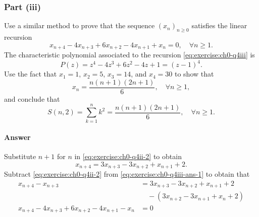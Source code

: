 \subsubsection{Part (iii)}
Use a similar method to prove that the sequence $ (x_n)_{n \geq 0} $ satisfies
    the linear recursion
\begin{equation}
    x_{n + 4} - 4 x_{n + 3} + 6 x_{n + 2} - 4 x_{n + 1} + x_n = 0, \quad
        \forall n \geq 1.
    \label{eq:exercise:ch0-q4iii}
\end{equation}
The characteristic polynomial associated to the recursion
    \eqref{eq:exercise:ch0-q4iii} is
\begin{equation*}
    P(z) = z^4 - 4 z^3 + 6 z^2 - 4 z + 1 = (z - 1)^4.
\end{equation*}
Use the fact that $ x_1 = 1 $, $ x_2 = 5 $, $ x_3 = 14 $, and $ x_4 = 30 $ to
    show that
\begin{equation*}
    x_n = \frac{n (n + 1) (2 n + 1)}{6}, \quad \forall n \geq 1,
\end{equation*}
and conclude that
\begin{equation*}
    S(n, 2) = \sum_{k=1}^{n} k^2 = \frac{n (n + 1) (2 n + 1)}{6}, \quad
        \forall n \geq 1.
\end{equation*}

\paragraph{Answer}
Substitute $ n + 1 $ for $ n $ in \eqref{eq:exercise:ch0-q4ii-2} to obtain
\begin{equation}
    x_{n + 4} = 3 x_{n + 3} - 3 x_{n + 2} + x_{n + 1} + 2.
    \label{eq:exercise:ch0-q4iii-ans-1}
\end{equation}
Subtract \eqref{eq:exercise:ch0-q4ii-2} from \eqref{eq:exercise:ch0-q4iii-ans-1} to obtain that
\begin{align*}
    x_{n + 4} - x_{n + 3} &= 3 x_{n + 3} - 3 x_{n + 2} + x_{n + 1} + 2 \\
                          &\quad - (3 x_{n + 2} - 3 x_{n + 1} + x_n + 2) \\
    x_{n + 4} - 4 x_{n + 3} + 6 x_{n + 2} - 4 x_{n + 1} - x_n &= 0
\end{align*}

